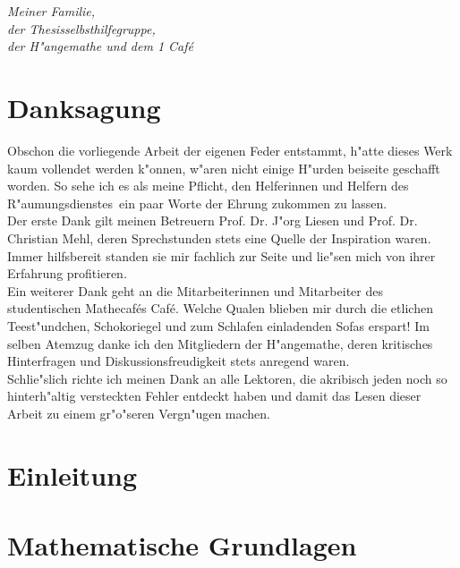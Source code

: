 \documentclass[11pt, twoside]{report}
\begin{document}
\newpage

\chapter*{}

\textit{Meiner Familie,\\
der Thesisselbsthilfegruppe,\\
der H"angemathe und dem 1 Caf\'e}

\chapter*{Danksagung}
Obschon die vorliegende Arbeit der eigenen Feder entstammt, h"atte dieses Werk kaum vollendet werden k"onnen,
w"aren nicht einige H"urden beiseite geschafft worden.
So sehe ich es als meine Pflicht, den Helferinnen und Helfern des \glqq R"aumungsdienstes\grqq\ ein paar Worte der Ehrung
zukommen zu lassen.\\

Der erste Dank gilt meinen Betreuern Prof. Dr. J"org Liesen und Prof. Dr. Christian Mehl, deren Sprechstunden
stets eine Quelle der Inspiration waren. Immer hilfsbereit standen sie mir fachlich zur Seite und lie"sen mich von ihrer Erfahrung profitieren.\\

Ein weiterer Dank geht an die Mitarbeiterinnen und Mitarbeiter des studentischen Mathecaf\'es  Caf\'e\grqq. Welche Qualen blieben mir durch
die etlichen Teest"undchen, Schokoriegel und zum Schlafen einladenden Sofas erspart! Im selben Atemzug
danke ich den Mitgliedern der \glqq H"angemathe\grqq, deren kritisches Hinterfragen und Diskussionsfreudigkeit stets anregend waren.\\

Schlie"slich richte ich meinen Dank an alle Lektoren, die akribisch jeden noch so hinterh"altig versteckten
Fehler entdeckt haben und damit das Lesen dieser Arbeit zu einem gr"o"seren Vergn"ugen machen.

\tableofcontents
\chapter*{}
\chapter{Einleitung}%


\chapter{Mathematische Grundlagen}
\label{chap2}
\end{document}
